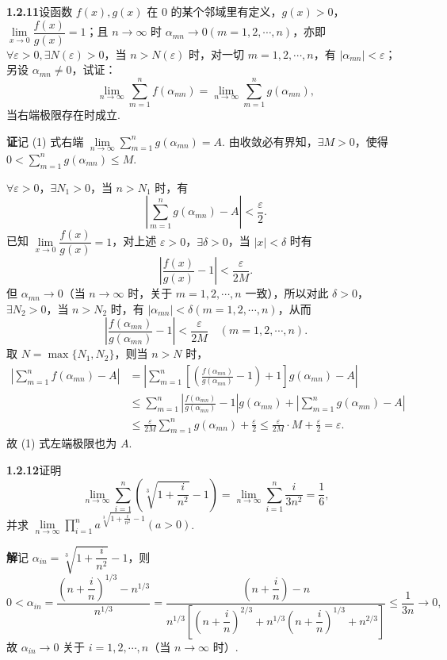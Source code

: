 \documentclass[UTF8, 12pt, fontset=fandol, oneside]{ctexart}
\begin{document}
\noindent\textbf{1.2.11}\quad 设函数 $f(x),g(x)$ 在 $0$ 的某个邻域里有定义，$g(x)>0$，$\lim\limits_{x\to0}\dfrac{f(x)}{g(x)}=1$；且 $n\to\infty$ 时 $\alpha_{mn}\to0(m=1,2,\cdots,n)$，亦即 $\forall\varepsilon>0,\exists N(\varepsilon)>0$，当 $n>N(\varepsilon)$ 时，对一切 $m=1,2,\cdots,n$，有 $|\alpha_{mn}|<\varepsilon$；另设 $\alpha_{mn}\ne0$，试证：
\[
  \lim_{n\to\infty}\sum_{m=1}^n f(\alpha_{mn})
  =
  \lim_{n\to\infty}\sum_{m=1}^n g(\alpha_{mn}),
\tag{1}
\]
当右端极限存在时成立.

\noindent\textbf{证}\quad 记 (1) 式右端 $\lim\limits_{n\to\infty}\sum\limits_{m=1}^n g(\alpha_{mn})=A$. 由收敛必有界知，$\exists M>0$，使得 $0<\sum\limits_{m=1}^n g(\alpha_{mn})\le M$.

$\forall\varepsilon>0$，$\exists N_1>0$，当 $n>N_1$ 时，有
\[
  \left|\sum_{m=1}^n g(\alpha_{mn})-A\right|<\frac{\varepsilon}{2}.
\]
已知 $\lim\limits_{x\to0}\dfrac{f(x)}{g(x)}=1$，对上述 $\varepsilon>0$，$\exists\delta>0$，当 $|x|<\delta$ 时有
\[
  \left|\frac{f(x)}{g(x)}-1\right|<\frac{\varepsilon}{2M}.
\]
但 $\alpha_{mn}\to0$（当 $n\to\infty$ 时，关于 $m=1,2,\cdots,n$ 一致），所以对此 $\delta>0$，$\exists N_2>0$，当 $n>N_2$ 时，有 $|\alpha_{mn}|<\delta(m=1,2,\cdots,n)$，从而
\[
  \left|\frac{f(\alpha_{mn})}{g(\alpha_{mn})}-1\right|<\frac{\varepsilon}{2M}
  \quad(m=1,2,\cdots,n).
\]
取 $N=\max\{N_1,N_2\}$，则当 $n>N$ 时，
\[
\begin{aligned}
\left|\sum_{m=1}^n f(\alpha_{mn})-A\right|
&=\left|\sum_{m=1}^n\left[\left(\frac{f(\alpha_{mn})}{g(\alpha_{mn})}-1\right)+1\right]g(\alpha_{mn})-A\right|\\
&\le\sum_{m=1}^n\left|\frac{f(\alpha_{mn})}{g(\alpha_{mn})}-1\right|g(\alpha_{mn})
  +\left|\sum_{m=1}^n g(\alpha_{mn})-A\right|\\
&\le \frac{\varepsilon}{2M}\sum_{m=1}^n g(\alpha_{mn})+\frac{\varepsilon}{2}
\le\frac{\varepsilon}{2M}\cdot M+\frac{\varepsilon}{2}=\varepsilon.
\end{aligned}
\]
故 (1) 式左端极限也为 $A$.

\noindent\textbf{1.2.12}\quad 证明
\[
  \lim_{n\to\infty}\sum_{i=1}^n\left(\sqrt[3]{1+\frac{i}{n^2}}-1\right)
  =
  \lim_{n\to\infty}\sum_{i=1}^n\frac{i}{3n^2}
  =\frac16,
\]
并求 $\lim\limits_{n\to\infty}\prod\limits_{i=1}^n a^{\sqrt[3]{1+\frac{i}{n^2}}-1}(a>0)$.

\noindent\textbf{解}\quad 记 $\alpha_{in}=\sqrt[3]{1+\dfrac{i}{n^2}}-1$，则
\[
0<\alpha_{in}
=\frac{\left(n+\dfrac{i}{n}\right)^{1/3}-n^{1/3}}{n^{1/3}}
=\frac{\left(n+\dfrac{i}{n}\right)-n}
{n^{1/3}\left[\left(n+\dfrac{i}{n}\right)^{2/3}
+n^{1/3}\left(n+\dfrac{i}{n}\right)^{1/3}+n^{2/3}\right]}
\le\frac1{3n}\to0,
\]
故 $\alpha_{in}\to0$ 关于 $i=1,2,\cdots,n$（当 $n\to\infty$ 时）.
\end{document}
